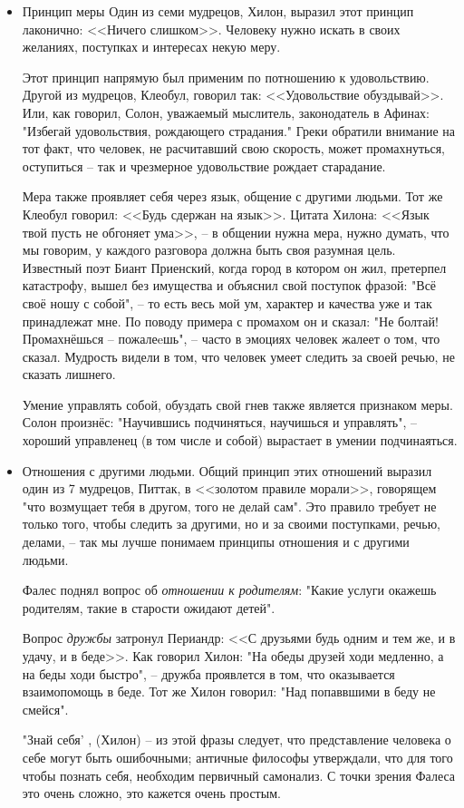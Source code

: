 \documentclass[a4paper, 12pt]{book} %
\begin{document}
\begin{itemize}
\item Принцип меры 
Один из семи мудрецов, Хилон, выразил этот принцип лаконично: <<Ничего слишком>>. Человеку нужно искать в своих желаниях, поступках и интересах некую меру.

Этот принцип напрямую был применим по потношению к удовольствию. Другой из мудрецов, Клеобул, говорил так: <<Удовольствие обуздывай>>. Или, как говорил, Солон, уважаемый мыслитель, законодатель в Афинах: "Избегай удовольствия, рождающего страдания." Греки обратили внимание на тот факт, что человек, не расчитавший свою скорость, может промахнуться, оступиться -- так и чрезмерное удовольствие рождает старадание.

Мера также проявляет себя через язык, общение с другими людьми. Тот же Клеобул говорил: <<Будь сдержан на язык>>. Цитата Хилона: <<Язык твой пусть не обгоняет ума>>, -- в общении нужна мера, нужно думать, что мы говорим, у каждого разговора должна быть своя разумная цель. Известный поэт Биант Приенский, когда город в котором он жил, претерпел катастрофу, вышел без имущества и объяснил свой поступок фразой: "Всё своё ношу с собой", -- то есть весь мой ум, характер и качества уже и так принадлежат мне. По поводу примера с промахом он и сказал: "Не болтай! Промахнёшься -- пожалеeшь", -- часто в эмоциях человек жалеет о том, что сказал. Мудрость видели в том, что человек умеет следить за своей речью, не сказать лишнего.

Умение управлять собой, обуздать свой гнев также является признаком меры. Солон произнёс: "Научившись подчиняться, научишься и управлять", -- хороший управленец (в том числе и собой) вырастает в умении подчинаяться.

\item Отношения с другими людьми. Общий принцип этих отношений выразил один из 7 мудрецов, Питтак, в <<золотом правиле морали>>, говорящем "что возмущает тебя в другом, того не делай сам". Это правило требует не только того, чтобы следить за другими, но и за своими поступками, речью, делами, -- так мы лучше понимаем принципы отношения и с другими людьми.

Фалес поднял вопрос об \textit{отношении к родителям}: "Какие услуги окажешь родителям, такие в старости ожидают детей".

Вопрос \textit{дружбы} затронул Периандр: <<С друзьями будь одним и тем же, и в удачу, и в беде>>. Как говорил Хилон: "На обеды друзей ходи медленно, а на беды ходи быстро", -- дружба проявлется в том, что оказывается взаимопомощь в беде. Тот же Хилон говорил: "Над попаввшими в беду не смейся".

"Знай себя' , (Хилон) -- из этой фразы следует, что представление человека о себе могут быть ошибочными; античные философы утверждали, что для того чтобы познать себя, необходим первичный самонализ. С точки зрения Фалеса это очень сложно, это кажется очень простым.

\end{itemize}
\end{document}
